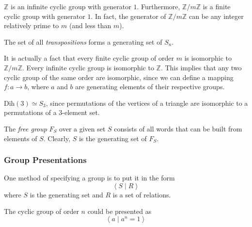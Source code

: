 \documentclass{article}
\begin{document}
      \begin{example}
        $\mathbb{Z}$ is an infinite cyclic group with generator $1$. Furthermore, $\mathbb{Z}/m\mathbb{Z}$ is a finite cyclic group with generator $1$. In fact, the generator of $\mathbb{Z}/m\mathbb{Z}$ can be any integer relatively prime to $m$ (and less than $m$). \end{example}

      \begin{example}
        The set of all \textit{transpositions} forms a generating set of $S_{n}$. 
      \end{example}

      It is actually a fact that every finite cyclic group of order $m$ is isomorphic to $\mathbb{Z}/m\mathbb{Z}$. Every infinite cyclic group is isomorphic to $\mathbb{Z}$. This implies that any two cyclic group of the same order are isomorphic, since we can define a mapping $f:a\longrightarrow b$, where $a$ and $b$ are generating elements of their respective groups. 

      \begin{example}
        Dih$(3) \simeq S_{3}$, since permutations of the vertices of a triangle are isomorphic to a permutations of a 3-element set. 
      \end{example}

      \begin{definition}
        The \textit{free group} $F_{S}$ over a given set $S$ consists of all words that can be built from elements of $S$. Clearly, $S$ is the generating set of $F_{S}$. 
      \end{definition}

    \subsubsection{Group Presentations}

      One method of specifying a group is to put it in the form
      \begin{equation}
        \big\langle \; S \; | \; R \;\big\rangle
      \end{equation}
      where $S$ is the generating set and $R$ is a set of relations. 

      \begin{example}
        The cyclic group of order $n$ could be presented as
        \begin{equation}
          \big\langle \; a \; | \; a^{n} = 1 \;\big\rangle
        \end{equation}
      \end{example}
\end{document}
